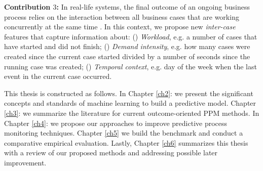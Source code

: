 \noindent \textbf{Contribution $3$:} In real-life systems, the final outcome of an ongoing business process relies on the interaction between all business cases that are working concurrently at the same time \cite{senderovich2019knowledge}. In this context, we propose new \textit{inter-case} features that capture information about: () \emph{Workload}, e.g. a number of cases that have started and did not finish; () \emph{Demand intensity}, e.g. how many cases were created since the current case started divided by a number of seconds since the running case was created; () \emph{Temporal context}, e.g. day of the week when the last event in the current case occurred.


This thesis is constructed as follows. In Chapter \ref{ch2}: we present the significant concepts and standards of machine learning to build a predictive model.  Chapter \ref{ch3}: we summarize the literature for current outcome-oriented PPM methods.  In Chapter \ref{ch4}: we propose our approaches to improve predictive process monitoring techniques. Chapter \ref{ch5} we build the benchmark and conduct a comparative empirical evaluation. Lastly, Chapter \ref{ch6} summarizes this thesis with a review of our proposed methods and addressing possible later improvement.














